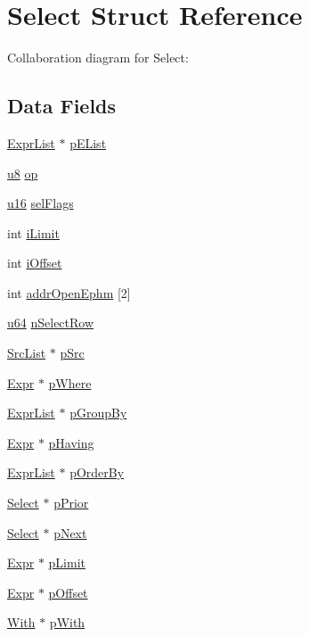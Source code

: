 \hypertarget{struct_select}{}\section{Select Struct Reference}
\label{struct_select}


Collaboration diagram for Select\+:
\subsection*{Data Fields}
\begin{DoxyCompactItemize}
\item 
\hyperlink{struct_expr_list}{Expr\+List} $\ast$ \hyperlink{struct_select_a08025e7aa4f4c6b65204b463580746ef}{p\+E\+List}
\item 
\hyperlink{sqlite3_8c_a74a0f6424ae628af25f23f0a35f6ead3}{u8} \hyperlink{struct_select_a0991b29aa40e12f033237266ebe6610c}{op}
\item 
\hyperlink{sqlite3_8c_a20f2299e322dcbde37cb07b16910b843}{u16} \hyperlink{struct_select_a395e9a724a388ac62439b4c162e3b051}{sel\+Flags}
\item 
int \hyperlink{struct_select_a2f7ebf02d49ab350a4978abefe1a6874}{i\+Limit}
\item 
int \hyperlink{struct_select_a7257a503e6fefa9f18d900e52ec8dc75}{i\+Offset}
\item 
int \hyperlink{struct_select_aec1d8ba6d2600933d0da4e8c138b760f}{addr\+Open\+Ephm} \mbox{[}2\mbox{]}
\item 
\hyperlink{sqlite3_8c_a0e0cdb443a471891a042a6bfdc4644ca}{u64} \hyperlink{struct_select_a6ffd32b047af2ae043f5ac02c5507cca}{n\+Select\+Row}
\item 
\hyperlink{struct_src_list}{Src\+List} $\ast$ \hyperlink{struct_select_a84a7e06ff4c94a96573b33b55a0e23cf}{p\+Src}
\item 
\hyperlink{struct_expr}{Expr} $\ast$ \hyperlink{struct_select_aa35a11dc7821bfaf357249ff3da68863}{p\+Where}
\item 
\hyperlink{struct_expr_list}{Expr\+List} $\ast$ \hyperlink{struct_select_ab73f489b26450bf7c199d78c93092cea}{p\+Group\+By}
\item 
\hyperlink{struct_expr}{Expr} $\ast$ \hyperlink{struct_select_afc7e0bb89d63e1b2ca12d2d083ab7d05}{p\+Having}
\item 
\hyperlink{struct_expr_list}{Expr\+List} $\ast$ \hyperlink{struct_select_a9150e506e5902e336130c9764caf96a0}{p\+Order\+By}
\item 
\hyperlink{struct_select}{Select} $\ast$ \hyperlink{struct_select_a380ce35e11c269ed7950cba7dffe2934}{p\+Prior}
\item 
\hyperlink{struct_select}{Select} $\ast$ \hyperlink{struct_select_aac48b00813a5c8f3392f9ab6cc0c260e}{p\+Next}
\item 
\hyperlink{struct_expr}{Expr} $\ast$ \hyperlink{struct_select_a343fcdf61b7e033a4d8cb1f3484e8002}{p\+Limit}
\item 
\hyperlink{struct_expr}{Expr} $\ast$ \hyperlink{struct_select_aeca6406d3cede0e3423dde49f008567b}{p\+Offset}
\item 
\hyperlink{struct_with}{With} $\ast$ \hyperlink{struct_select_a49014e0850234bf861fd5de6ea610b7e}{p\+With}
\end{DoxyCompactItemize}


